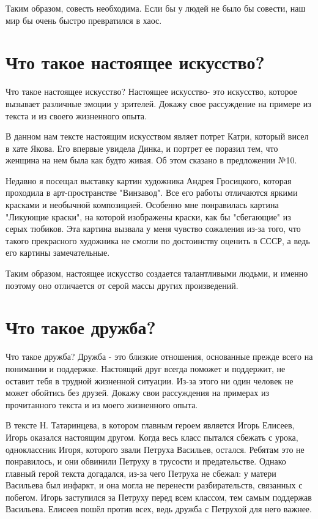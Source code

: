 \documentclass[12pt, letterpaper]{article}
\begin{document}
Таким образом, совесть необходима. Если бы у людей не было бы совести, наш мир бы очень быстро превратился в хаос. 
\section {Что такое настоящее искусство?}

Что такое настоящее искусство? Настоящее искусство- это искусство, которое вызывает различные эмоции у зрителей. Докажу свое рассуждение на примере из текста и из своего жизненного опыта.

В данном нам тексте настоящим искусством являет потрет Катри, который висел в хате Якова. Его впервые увидела Динка, и портрет ее поразил тем, что женщина на нем была как будто живая. Об этом сказано в предложении №10.

Недавно я посещал выставку картин художника Андрея Гросицкого, которая проходила в арт-пространстве "Винзавод". Все его работы отличаются яркими красками и необычной композицией. Особенно мне понравилась картина "Ликующие краски", на которой изображены краски, как бы "сбегающие" из серых тюбиков. Эта картина вызвала у меня чувство сожаления из-за того, что такого прекрасного художника не смогли по достоинству оценить в СССР, а ведь его картины замечательные.

Таким образом, настоящее искусство создается талантливыми людьми, и именно поэтому оно отличается от серой массы других произведений. 
\section{Что такое дружба?}
Что такое дружба? Дружба -  это близкие отношения, основанные прежде всего на понимании и поддержке. Настоящий друг всегда поможет и поддержит, не оставит тебя в трудной жизненной ситуации. Из-за этого ни один человек не может обойтись без друзей. Докажу свои рассуждения на примерах из прочитанного текста и из моего жизненного опыта.

В тексте Н. Татаринцева, в котором главным героем является Игорь Елисеев, Игорь оказался настоящим другом.  Когда весь класс пытался сбежать с урока, одноклассник Игоря, которого звали Петруха Васильев, остался. Ребятам это не понравилось, и они обвинили Петруху в трусости и предательстве. Однако главный герой текста догадался, из-за чего Петруха не сбежал: у матери Васильева был инфаркт, и она могла не перенести разбирательств, связанных с побегом. Игорь заступился за Петруху перед всем классом, тем самым поддержав Васильева. Елисеев пошёл против всех, ведь дружба с Петрухой для него важнее. 
\end{document}
